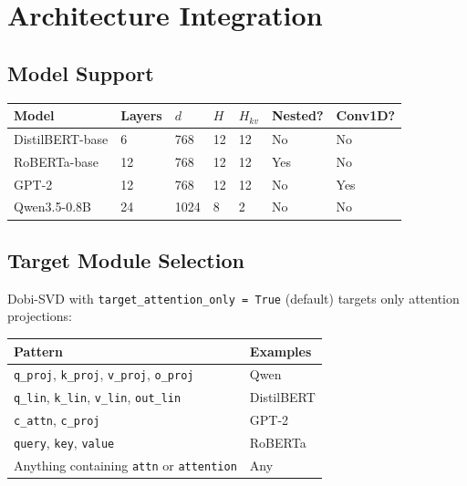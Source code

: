 
\section{Architecture Integration}

\subsection{Model Support}

\begin{table}[H]
\centering
\small
\begin{tabular}{lllllll}
\toprule
\textbf{Model} & \textbf{Layers} & \textbf{$d$} & \textbf{$H$} & \textbf{$H_{kv}$} & \textbf{Nested?} & \textbf{Conv1D?} \\
\midrule
DistilBERT-base & 6 & 768 & 12 & 12 & No & No \\
RoBERTa-base & 12 & 768 & 12 & 12 & Yes & No \\
GPT-2 & 12 & 768 & 12 & 12 & No & Yes \\
Qwen3.5-0.8B & 24 & 1024 & 8 & 2 & No & No \\
\bottomrule
\end{tabular}
\end{table}

\subsection{Target Module Selection}

Dobi-SVD with \texttt{target\_attention\_only = True} (default) targets only 
attention projections:

\begin{table}[H]
\centering
\small
\begin{tabular}{ll}
\toprule
\textbf{Pattern} & \textbf{Examples} \\
\midrule
\texttt{q\_proj}, \texttt{k\_proj}, \texttt{v\_proj}, \texttt{o\_proj} & Qwen \\
\texttt{q\_lin}, \texttt{k\_lin}, \texttt{v\_lin}, \texttt{out\_lin} & DistilBERT \\
\texttt{c\_attn}, \texttt{c\_proj} & GPT-2 \\
\texttt{query}, \texttt{key}, \texttt{value} & RoBERTa \\
Anything containing \texttt{attn} or \texttt{attention} & Any \\
\bottomrule
\end{tabular}
\end{table}


